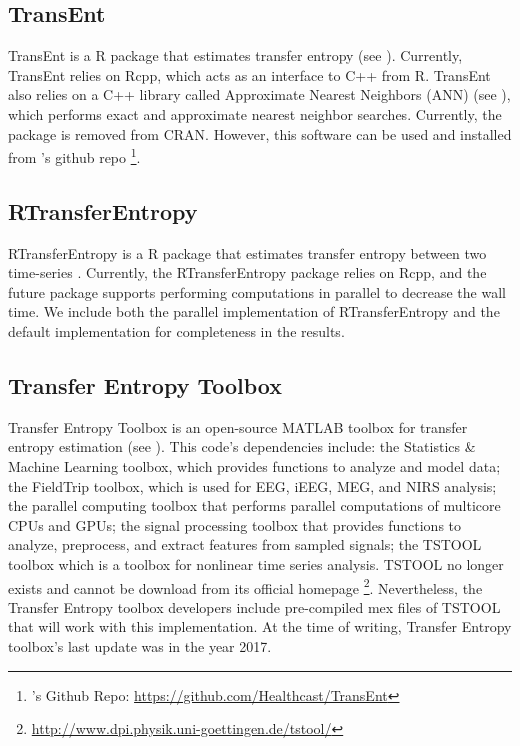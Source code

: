\subsection{TransEnt}
TransEnt is a R package that estimates transfer entropy (see \cite{TransEnt}). Currently, TransEnt relies on Rcpp, which acts as an interface to C++ from R. TransEnt also relies on a C++ library called Approximate Nearest Neighbors (ANN) (see \cite{ANN}), which performs exact and approximate nearest neighbor searches. Currently, the package is removed from CRAN. However, this software can be used and installed from \cite{TransEnt}'s github repo \footnote{\cite{TransEnt}'s Github Repo: \url{https://github.com/Healthcast/TransEnt}}.

\subsection{RTransferEntropy}
RTransferEntropy is a R package that estimates transfer entropy between two time-series \cite{RTransferEntropy}. Currently, the RTransferEntropy package relies on Rcpp, and the future package supports performing computations in parallel to decrease the wall time. We include both the parallel implementation of RTransferEntropy and the default implementation for completeness in the results.


\subsection{Transfer Entropy Toolbox}

Transfer Entropy Toolbox  is an open-source MATLAB toolbox for transfer entropy estimation (see \cite{TransferEntropyToolbox}). This code's dependencies include: the Statistics \& Machine Learning toolbox, which provides functions to analyze and model data; the FieldTrip toolbox, which is used for EEG, iEEG, MEG, and NIRS analysis; the parallel computing toolbox that performs parallel computations of multicore CPUs and GPUs; the signal processing toolbox that provides functions to analyze, preprocess, and extract features from sampled signals; the TSTOOL toolbox which is a toolbox for nonlinear time series analysis. TSTOOL no longer exists and cannot be download from its official homepage \footnote{\url{http://www.dpi.physik.uni-goettingen.de/tstool/}}. Nevertheless, the Transfer Entropy toolbox developers include pre-compiled mex files of TSTOOL that will work with this implementation. At the time of writing,  Transfer Entropy toolbox's last update was in the year 2017.

